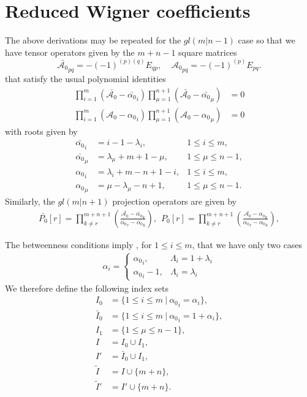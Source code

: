 \documentclass[12pt]{article}
\def\nn{\nonumber}
\begin{document}
\section{Reduced Wigner coefficients} 
\label{Wigner}
The above derivations may be repeated for the $gl(m|n-1)$ case so that we have tensor operators given by the $m+n-1$ square matrices
$$
\bar{\mathcal{A}_0}_{pq} = -(-1)^{(p)(q)} E_{qp}, ~~~~~{\mathcal{A}_0}_{pq} = -(-1)^{(p)} E_{pq}.
$$
that satisfy the usual polynomial identities 
\begin{align*}
\prod_{i=1}^m (\bar{\mathcal{A}_0} - \bar{\alpha_0}_i) \prod^{n+1}_{\mu = 1} (\bar{\mathcal{A}_0} - \bar{\alpha_0}_\mu) &= 0 \\
	\prod^m_{i=1} (\mathcal{A}_0 - {\alpha_0}_i ) \prod^{n+1}_{\mu=1} (\mathcal{A}_0 - {\alpha_0}_\mu) &= 0 
\end{align*}
with roots given by
\begin{align*}
\bar{\alpha_0}_i  &= i - 1 -{\lambda}_i , &1\leq i\leq m, \\
\bar{\alpha_0}_\mu &= {\lambda}_\mu + m + 1 - \mu,  &1\leq \mu \leq n - 1, \\
{\alpha_0}_i &= {\lambda}_i + m - n + 1 - i, &1\leq i\leq m, \\
{\alpha_0}_\mu &= \mu-{\lambda}_\mu - n + 1, &1\leq \mu \leq n - 1.  
\end{align*}
Similarly, the $gl(m|n+1)$ projection operators are given by
\begin{align}
\bar{P_0}[r] = \prod_{k\neq r}^{m+n+1}\left( \frac{\bar{\mathcal{A}_0}  -\bar{\alpha_0}_k}{\bar{\alpha_0}_r - \bar{\alpha_0}_k} \right),
\ \ 
P_0[r] = \prod_{k\neq r}^{m+n+1}\left( 
\frac{\mathcal{A}_0-{\alpha_0}_k}
{{\alpha_0}_r-{\alpha_0}_k} \right),
\end{align}

The betweenness conditions imply 
\cite{GIW1}, for $1\leq i\leq m$, that we have only two cases
\begin{align}
\alpha_i = \left\{ \begin{array}{rl} {\alpha_0}_i,& \Lambda_i = 1+\lambda_i\\
                                    {\alpha_0}_i - 1,& \Lambda_i = \lambda_i 
\end{array} \right.
\nn
\end{align}
We therefore define the following index sets
\begin{align}
I_0 &=  \{ 1\leq i\leq m\ |\ {\alpha_0}_i=\alpha_i\},\nn\\
\bar{I}_0 &=  \{ 1\leq i\leq m\ |\ {\alpha_0}_i=1+\alpha_i\},\nn\\
I_1 &= \{ 1\leq\mu\leq n-1\},\nn\\
I &= I_0\cup I_1,\nn\\
I'&= \bar{I}_0\cup I_1,\nn\\
\tilde{I} &= I\cup \{m+n\},\nn\\
\tilde{I}' &= I'\cup \{m+n\}.
\label{DefIndexSets} 
\end{align}
\end{document}
